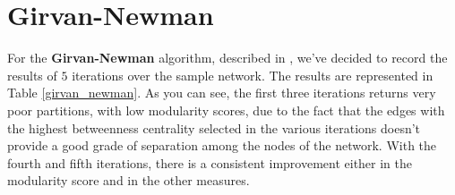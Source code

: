 
\section{Girvan-Newman} %
\label{sec:girvan_newman}
    For the \textbf{Girvan-Newman} algorithm, described in \cite{girvan_newman}, we've decided to record
    the results of $5$ iterations over the sample network. The results are represented in Table
    \ref{girvan_newman}. As you can see, the first three iterations returns very poor partitions, with low
    modularity scores, due to the fact that the edges with the highest betweenness centrality selected in the various
    iterations doesn't provide a good grade of separation among the nodes of the network. With the fourth and fifth
    iterations, there is a consistent improvement either in the modularity score and in the other measures.
    \begin{table}[H]
        \centering
        \begin{subtable}{\textwidth}
        \end{subtable}
        \caption{Evaluation of the partition obtained by the application of the Girvan-Newman algorithm.}
        \label{girvan_newman}
    \end{table}

